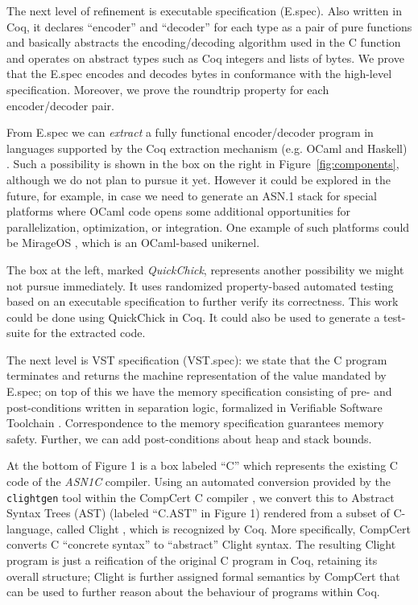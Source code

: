 \documentclass[10p,conference]{IEEEtran}
\begin{document}
The next level of refinement is executable specification (E.spec). Also
written in Coq, it declares ``encoder'' and ``decoder'' for each type
as a pair of pure functions and basically abstracts the encoding/decoding algorithm used in the C function and operates on abstract types such as Coq integers and lists of bytes. We prove that the E.spec encodes and decodes bytes in conformance with the high-level
specification. Moreover, we prove the roundtrip property for each encoder/decoder pair.

From E.spec we can \textit{extract} a fully functional encoder/decoder program in
languages supported by the Coq extraction mechanism (e.g. OCaml and
Haskell) \cite{Extraction}. Such a possibility is shown in the box
on the right in Figure~\ref{fig:components}, although we do not plan to
pursue it yet. However it could be explored in the future, for example,
in case we need to generate an ASN.1 stack for special platforms where
OCaml code opens some additional opportunities for parallelization,
optimization, or integration. One example of such platforms could be
MirageOS \cite{MirageOS}, which is an OCaml-based unikernel.

The box at the left, marked \textit{QuickChick}, represents another
possibility we might not pursue immediately. It uses randomized
property-based automated testing based on an executable
specification to further verify its correctness. This work could be
done using QuickChick \cite{QuickChick} in Coq. It could also be used
to generate a test-suite for the extracted code.

The next level is VST specification (VST.spec): we state that the C program terminates and returns the machine representation of the value mandated by E.spec; on top of this we have the memory specification consisting of pre- and post-conditions written in separation logic, formalized in Verifiable Software Toolchain  \cite{VST}. Correspondence to the memory specification guarantees memory safety. Further, we can add post-conditions about heap and stack bounds. 

At the bottom of Figure 1 is a box labeled ``C'' which represents the
existing C code of the \emph{ASN1C} compiler. Using an automated conversion
provided by the \texttt{clightgen} tool within the CompCert C compiler
\cite{CompCert}, we convert this to Abstract Syntax Trees (AST)
\cite{AST} (labeled ``C.AST'' in Figure 1) rendered from a subset
of C-language, called Clight \cite{Mechanized}, which is recognized by Coq. More specifically,
CompCert converts C ``concrete syntax'' to ``abstract'' Clight
syntax. The resulting Clight program is just a reification of the
original C program in Coq, retaining its overall structure; Clight is further assigned formal semantics
by CompCert that can be used to further reason about the behaviour of programs within Coq. 
\end{document}
